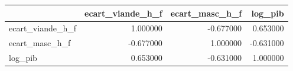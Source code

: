 \begin{tabular}{lrrr}
\toprule
 & ecart_viande_h_f & ecart_masc_h_f & log_pib \\
\midrule
ecart_viande_h_f & 1.000000 & -0.677000 & 0.653000 \\
ecart_masc_h_f & -0.677000 & 1.000000 & -0.631000 \\
log_pib & 0.653000 & -0.631000 & 1.000000 \\
\bottomrule
\end{tabular}
